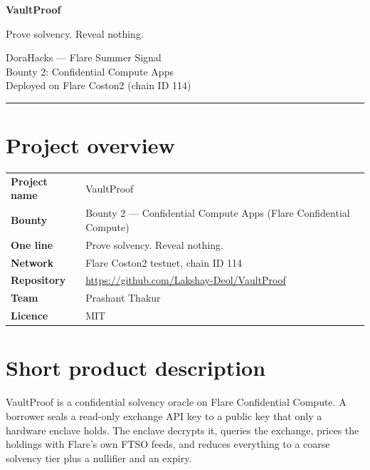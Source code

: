 \documentclass[11pt,a4paper]{article}
\newcommand{\ProjectName}{VaultProof}
\newcommand{\TeamName}{Prashant Thakur}
\newcommand{\RepoURL}{https://github.com/Lakshay-Deol/VaultProof}
\newcommand{\ChainName}{Flare Coston2}
\newcommand{\ChainID}{114}
\begin{document}
\begin{center}
  {\Huge\bfseries \ProjectName\par}
  \vspace{0.4em}
  {\large\color{flare} Prove solvency. Reveal nothing.\par}
  \vspace{0.9em}
  {\color{inkmuted}
   DoraHacks --- Flare Summer Signal\\
   Bounty 2: Confidential Compute Apps\\
   Deployed on \ChainName{} (chain ID \ChainID)\par}
\end{center}

\vspace{0.6em}
{\color{rulegrey}\hrule}
\vspace{1.4em}

\tableofcontents
\vspace{1.2em}

\section{Project overview}

\begin{tabularx}{\textwidth}{@{}l L@{}}
  \toprule
  \textbf{Project name}   & \ProjectName \\
  \textbf{Bounty}         & Bounty 2 --- Confidential Compute Apps (Flare Confidential Compute) \\
  \textbf{One line}       & Prove solvency. Reveal nothing. \\
  \textbf{Network}        & \ChainName{} testnet, chain ID \ChainID \\
  \textbf{Repository}     & \url{\RepoURL} \\
  \textbf{Team}           & \TeamName \\
  \textbf{Licence}        & MIT \\
  \bottomrule
\end{tabularx}

\section{Short product description}

\ProjectName{} is a confidential solvency oracle on Flare Confidential Compute.
A borrower seals a read-only exchange API key to a public key that only a
hardware enclave holds. The enclave decrypts it, queries the exchange, prices
the holdings with Flare's own FTSO feeds, and reduces everything to a coarse
solvency tier plus a nullifier and an expiry.
\end{document}
